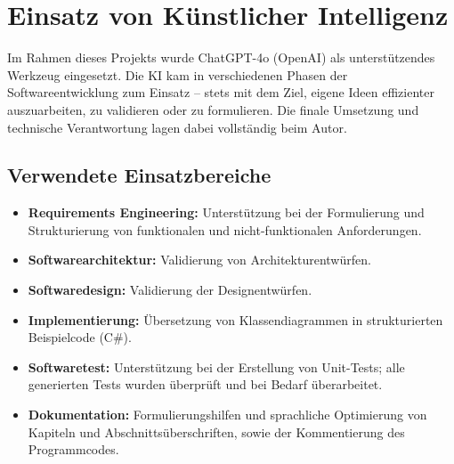 \documentclass[a4paper,12pt]{article}
\begin{document}
\newpage

\section{Einsatz von Künstlicher Intelligenz}

Im Rahmen dieses Projekts wurde ChatGPT-4o (OpenAI) als unterstützendes Werkzeug eingesetzt. Die KI kam in verschiedenen Phasen der Softwareentwicklung zum Einsatz – stets mit dem Ziel, eigene Ideen effizienter auszuarbeiten, zu validieren oder zu formulieren. Die finale Umsetzung und technische Verantwortung lagen dabei vollständig beim Autor.

\subsection*{Verwendete Einsatzbereiche}

\begin{itemize}
    \item \textbf{Requirements Engineering:} Unterstützung bei der Formulierung und Strukturierung von funktionalen und nicht-funktionalen Anforderungen.
    \item \textbf{Softwarearchitektur:} Validierung von Architekturentwürfen.
    \item \textbf{Softwaredesign:} Validierung der Designentwürfen.
    \item \textbf{Implementierung:} Übersetzung von Klassendiagrammen in strukturierten Beispielcode (C\#).
    \item \textbf{Softwaretest:} Unterstützung bei der Erstellung von Unit-Tests; alle generierten Tests wurden überprüft und bei Bedarf überarbeitet.
    \item \textbf{Dokumentation:} Formulierungshilfen und sprachliche Optimierung von Kapiteln und Abschnittsüberschriften, sowie der Kommentierung des Programmcodes.
\end{itemize}
\end{document}

